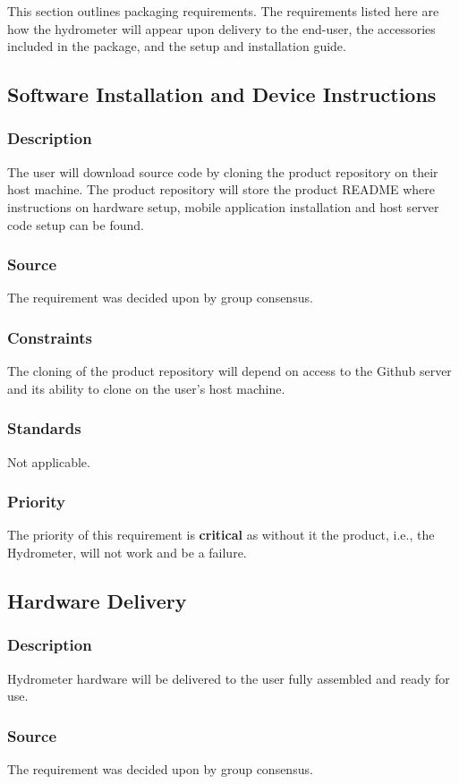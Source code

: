 This section outlines packaging requirements. The requirements listed here are how the hydrometer will appear upon delivery to the end-user, the accessories included in the package, and the setup and installation guide.

\subsection{Software Installation and Device Instructions}
\subsubsection{Description}
The user will download source code by cloning the product repository on their host machine. The product repository will store the product README where instructions on hardware setup, mobile application installation and host server code setup can be found.
\subsubsection{Source}
The requirement was decided upon by group consensus.
\subsubsection{Constraints}
The cloning of the product repository will depend on access to the Github server and its ability to clone on the user's host machine.
\subsubsection{Standards}
Not applicable.
\subsubsection{Priority}
The priority of this requirement is \textbf{critical} as without it the product, i.e., the Hydrometer, will not work and be a failure.
\subsection{Hardware Delivery}
\subsubsection{Description}
Hydrometer hardware will be delivered to the user fully assembled and ready for use. 
\subsubsection{Source}
The requirement was decided upon by group consensus.
